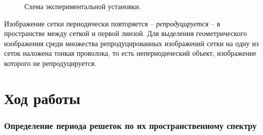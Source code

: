 \documentclass[a4paper,12pt]{article}
\begin{document}
	\begin{figure}[h]
		\caption{Схема экспериментальной установки.}
		\label{fig:ustanovka}
	\end{figure}
	
	Изображение сетки периодически повторяется -- \textit{репродуцируется} -- в пространстве между сеткой и первой линзой. Для выделения геометрического изображения среди множества репродуцированных изображений сетки на одну из сеток наложена тонкая проволока, то есть непериодический объект, изображение которого не репродуцируется.
	
\section*{Ход работы}

\subsubsection*{Определение периода решеток по их пространственному спектру}
\end{document}
